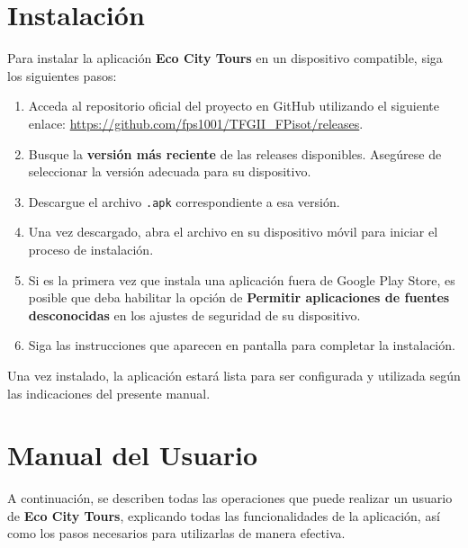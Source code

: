 \section{Instalación}

Para instalar la aplicación \textbf{Eco City Tours} en un dispositivo compatible, siga los siguientes pasos:

\begin{enumerate}
	\item Acceda al repositorio oficial del proyecto en GitHub utilizando el siguiente enlace: 
	\url{https://github.com/fps1001/TFGII_FPisot/releases}.
	\item Busque la \textbf{versión más reciente} de las releases disponibles. Asegúrese de seleccionar la versión adecuada para su dispositivo.
	\item Descargue el archivo \texttt{.apk} correspondiente a esa versión.
	\item Una vez descargado, abra el archivo en su dispositivo móvil para iniciar el proceso de instalación.
	\item Si es la primera vez que instala una aplicación fuera de Google Play Store, es posible que deba habilitar la opción de \textbf{Permitir aplicaciones de fuentes desconocidas} en los ajustes de seguridad de su dispositivo.
	\item Siga las instrucciones que aparecen en pantalla para completar la instalación.
\end{enumerate}

Una vez instalado, la aplicación estará lista para ser configurada y utilizada según las indicaciones del presente manual.

\section{Manual del Usuario}
A continuación, se describen todas las operaciones que puede realizar un usuario de \textbf{Eco City Tours}, explicando todas las funcionalidades de la aplicación, así como los pasos necesarios para utilizarlas de manera efectiva.

